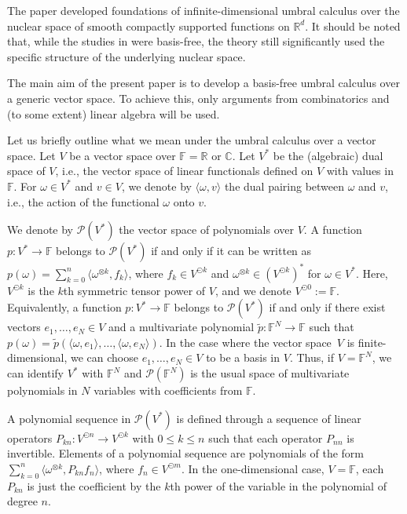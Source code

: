 \documentclass[12pt]{article}
\theoremstyle{remark}
\theoremstyle{remark}
\theoremstyle{remark}
\begin{document}
  The paper \cite{FKLO} developed foundations of infinite-dimensional umbral calculus over the nuclear space of smooth compactly supported functions on $\mathbb R^d$. It should  be noted that, while the studies in \cite{FKLO} were basis-free, the theory still significantly used the specific structure of the underlying nuclear space.  
  
  The main aim of the present paper is to develop a basis-free umbral calculus over a generic vector space. To achieve this, only arguments from combinatorics and (to some extent) linear algebra will be used.   
  
Let us briefly outline what we mean under the  umbral calculus over a vector space. Let $V$ be a vector space over $\mathbb F=\mathbb R$ or $\mathbb C$. Let $V^*$ be the (algebraic) dual space of $V$, i.e., the vector space of linear functionals defined on $V$ with values in $\mathbb F$.  For $\omega\in V^*$ and $v\in V$, we denote by $\langle \omega,v\rangle$ the dual pairing between $\omega$ and $v$, i.e., the action of the functional $\omega$ onto $v$. 

We denote by $\mathcal P(V^*)$ the vector space of polynomials over $V$.
A function $p:V^*\to\mathbb F$ belongs to $\mathcal P(V^*)$  if and only if it can be written as $p(\omega)=\sum_{k=0}^n \langle\omega^{\otimes k},f_k\rangle$, 
 where $f_k\in V^{\odot k}$ and $\omega^{\otimes k}\in (V^{\odot k})^*$ for $\omega\in V^*$. Here, $V^{\odot k}$ is the $k$th  symmetric tensor power of $V$, and we denote $V^{\odot 0}:=\mathbb F$. 
Equivalently, a function $p:V^*\to\mathbb F$ belongs to $\mathcal P(V^*)$  if and only if there exist vectors $e_1,\dots,e_N\in V$ and a multivariate polynomial $\tilde p:\mathbb F^N\to\mathbb F$ such that $p(\omega)=\tilde p(\langle\omega,e_1\rangle,\dots,\langle \omega,e_N\rangle)$. In the case where the vector space~$V$ is finite-dimensional, we can choose 
$e_1,\dots,e_N\in V$ to be a basis in $V$.  Thus, if $V=\mathbb F^N$, we can identify $V^*$ with $\mathbb F^N$ and $\mathcal P(\mathbb F^N)$ is the usual space of multivariate polynomials in $N$ variables with coefficients from $\mathbb F$. 

A polynomial sequence in $\mathcal P(V^*)$ is defined through a sequence of linear operators $P_{kn}:V^{\odot n}\to V^{\odot k}$ with $0\le k\le n$ such that each operator $P_{nn}$ is invertible. Elements of a polynomial sequence are polynomials of the form $\sum_{k=0}^n\langle\omega^{\otimes k},P_{kn}f_n\rangle$, where $f_n\in V^{\odot m}$. In the one-dimensional case, $V=\mathbb F$, each $P_{kn}$ is just the coefficient by the $k$th power of the variable in the polynomial of degree $n$.
\end{document}
